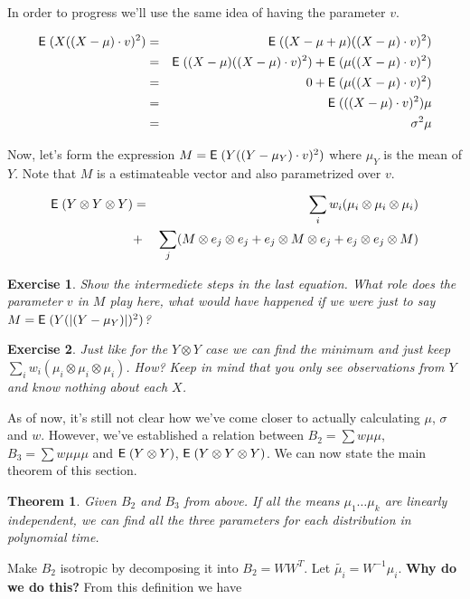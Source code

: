 \documentclass{book}
\newtheorem{theorem}{Theorem}[chapter]
\newtheorem{exercise}{Exercise}
\numberwithin{exercise}{chapter}
\begin{document}
In order to progress we'll use the same idea of having the parameter
$v$.

\begin{eqnarray*}
  \hbox{{\sf E}\;}(X((X-\mu) \cdot v)^2)
  &=& \hbox{{\sf E}\;}((X-\mu+\mu)((X-\mu) \cdot v)^2) \\
  &=& \hbox{{\sf E}\;}((X-\mu)((X-\mu) \cdot v)^2) + \hbox{{\sf E}\;}(\mu((X-\mu) \cdot v)^2) \\
  &=& 0 + \hbox{{\sf E}\;}(\mu((X-\mu) \cdot v)^2) \\
  &=& \hbox{{\sf E}\;}(((X-\mu) \cdot v)^2)\mu \\
  &=& \sigma^2 \mu
\end{eqnarray*}


Now, let's form the expression $M = \hbox{{\sf E}\;}(Y((Y-\mu_Y) \cdot v)^2 )$ where
$\mu_Y$ is the mean of $Y$. Note that $M$ is a estimateable vector and
also parametrized over $v$.

\begin{eqnarray*}
  \hbox{{\sf E}\;}(Y \otimes Y \otimes Y)
  &=& \sum_i w_i (\mu_i \otimes \mu_i \otimes \mu_i) \\
  &+& \sum_j (M \otimes e_j \otimes e_j + e_j \otimes M \otimes e_j + e_j \otimes e_j \otimes M)
\end{eqnarray*}

\begin{exercise}
  Show the intermediete steps in the last equation. What role does the
  parameter $v$ in $M$ play here, what would have happened if we were
  just to say $M = \hbox{{\sf E}\;}(Y(|(Y-\mu_Y)|)^2 )$?
\end{exercise}


\begin{exercise}
  Just like for the $Y \otimes Y$ case we can find the minimum and just
  keep $\sum_i w_i (\mu_i \otimes \mu_i \otimes \mu_i)$. How? Keep in
  mind that you only see observations from $Y$ and know nothing about
  each $X$.
\end{exercise}

As of now, it's still not clear how we've come closer to actually calculating
$\mu$, $\sigma$ and $w$. However, we've established a relation between $B_2 =
\sum w \mu \mu$, $B_3 = \sum w \mu \mu \mu$ and $\hbox{{\sf E}\;}(Y \otimes Y)$, $\hbox{{\sf E}\;}(Y
\otimes Y \otimes Y)$. We can now state the main theorem of this section.

\begin{theorem}\label{thm:learnmix}
  Given $B_2$ and $B_3$ from above. If all the means $\mu_1 \dots \mu_k$ are
  linearly independent, we can find all the three parameters for each
  distribution in polynomial time.
\end{theorem}

Make $B_2$ isotropic by decomposing it into $B_2 = W W^T$. Let $\tilde{\mu_i} =
W^{-1} \mu_i$.  \textbf{Why do we do this?} From this definition we have
\end{document}
